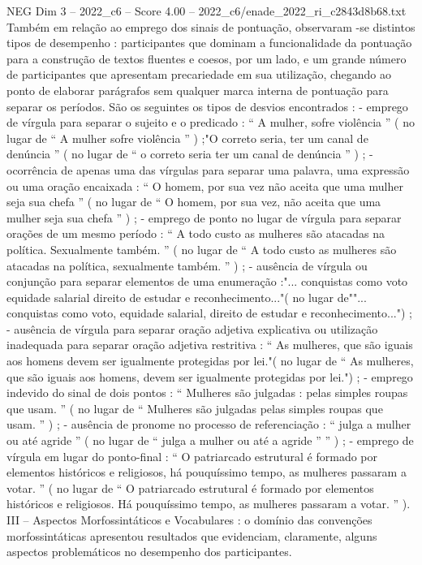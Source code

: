 \begin{textsample}{NEG Dim 3 – 2022\_c6 – Score 4.00 – 2022\_c6/enade\_2022\_ri\_c2843d8b68.txt}
Também em relação ao emprego dos sinais de pontuação, observaram -se distintos tipos de desempenho : participantes que dominam a funcionalidade da pontuação para a construção de textos fluentes e coesos, por um lado, e um grande número de participantes que apresentam precariedade em sua utilização, chegando ao ponto de elaborar parágrafos sem qualquer marca interna de pontuação para separar os períodos.
São os seguintes os tipos de desvios encontrados : - emprego de vírgula para separar o sujeito e o predicado : “ A mulher, sofre violência ” ( no lugar de “ A mulher sofre violência ” ) ;"O correto seria, ter um canal de denúncia ” ( no lugar de “ o correto seria ter um canal de denúncia ” ) ; - ocorrência de apenas uma das vírgulas para separar uma palavra, uma expressão ou uma oração encaixada : “ O homem, por sua vez não aceita que uma mulher seja sua chefa ” ( no lugar de “ O homem, por sua vez, não aceita que uma mulher seja sua chefa ” ) ; - emprego de ponto no lugar de vírgula para separar orações de um mesmo período : “ A todo custo as mulheres são atacadas na política.
Sexualmente também. ” ( no lugar de “ A todo custo as mulheres são atacadas na política, sexualmente também. ” ) ; - ausência de vírgula ou conjunção para separar elementos de uma enumeração :"... conquistas como voto equidade salarial direito de estudar e reconhecimento..."( no lugar de""... conquistas como voto, equidade salarial, direito de estudar e reconhecimento...") ; - ausência de vírgula para separar oração adjetiva explicativa ou utilização inadequada para separar oração adjetiva restritiva : “ As mulheres, que são iguais aos homens devem ser igualmente protegidas por lei."( no lugar de “ As mulheres, que são iguais aos homens, devem ser igualmente protegidas por lei.") ; - emprego indevido do sinal de dois pontos : “ Mulheres são julgadas : pelas simples roupas que usam. ” ( no lugar de “ Mulheres são julgadas pelas simples roupas que usam. ” ) ; - ausência de pronome no processo de referenciação : “ julga a mulher ou até agride ” ( no lugar de “ julga a mulher ou até a agride ” ” ) ; - emprego de vírgula em lugar do ponto-final : “ O patriarcado estrutural é formado por elementos históricos e religiosos, há pouquíssimo tempo, as mulheres passaram a votar. ” ( no lugar de “ O patriarcado estrutural é formado por elementos históricos e religiosos.
Há pouquíssimo tempo, as mulheres passaram a votar. ” ).
III – Aspectos Morfossintáticos e Vocabulares : o domínio das convenções morfossintáticas apresentou resultados que evidenciam, claramente, alguns aspectos problemáticos no desempenho dos participantes.

\end{textsample}
